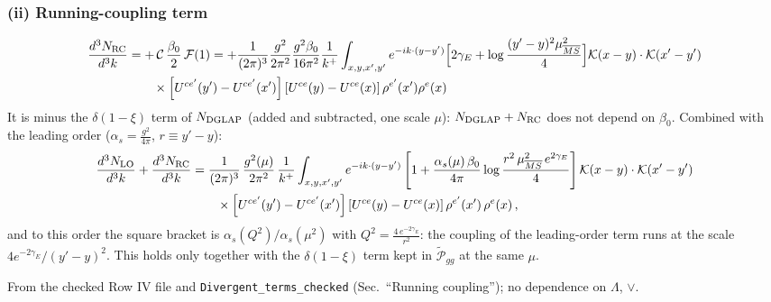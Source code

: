 \documentclass[9pt]{article}
\numberwithin{equation}{section}
\begin{document}
\subsubsection{(ii) Running-coupling term}
\begin{align}
\frac{d^{3}N_{\rm RC}}{d^{3}k} & = +\,\mathcal{C}\,\frac{\beta_{0}}{2}\,\mathcal{F}(1)= +\frac{1}{(2\pi)^{3}}\frac{g^{2}}{2\pi^{2}}\frac{g^{2}\beta_{0}}{16\pi^{2}}\frac{1}{k^{+}}\int_{x,y,x',y'}e^{-ik\cdot(y-y')}\Big[2\gamma_{E}+\log\frac{(y'-y)^{2}\mu^{2}_{\overline{MS}}}{4}\Big]\mathcal{K}(x-y)\cdot\mathcal{K}(x'-y')\notag \\ & \qquad\times\left[U^{ce'}(y') - U^{ce'}(x')\right]\left[U^{ce}(y) - U^{ce}(x)\right]\rho^{e'}(x')\rho^{e}(x)
\end{align}
It is minus the $\delta(1-\xi)$ term of $N_{\rm DGLAP}$ (added and subtracted, one scale $\mu$): $N_{\rm DGLAP}+N_{\rm RC}$ does not depend on $\beta_{0}$. Combined with the leading order ($\alpha_{s}=\frac{g^{2}}{4\pi}$, $r\equiv y'-y$):
\begin{align}
\frac{d^{3}N_{\rm LO}}{d^{3}k}+\frac{d^{3}N_{\rm RC}}{d^{3}k}&=\frac{1}{(2\pi)^{3}}\,\frac{g^{2}(\mu)}{2\pi^{2}}\,\frac{1}{k^{+}}\int_{x,y,x',y'}e^{-ik\cdot(y-y')}\left[1+\frac{\alpha_{s}(\mu)\,\beta_{0}}{4\pi}\log\frac{r^{2}\,\mu^{2}_{\overline{MS}}\,e^{2\gamma_{E}}}{4}\right]\mathcal{K}(x-y)\cdot\mathcal{K}(x'-y')\notag\\
&\qquad\times\left[U^{ce'}(y')-U^{ce'}(x')\right]\left[U^{ce}(y)-U^{ce}(x)\right]\rho^{e'}(x')\,\rho^{e}(x)\,,
\end{align}
and to this order the square bracket is $\alpha_{s}(Q^{2})/\alpha_{s}(\mu^{2})$ with $Q^{2}=\frac{4\,e^{-2\gamma_{E}}}{r^{2}}$: the coupling of the leading-order term runs at the scale $4e^{-2\gamma_{E}}/(y'-y)^{2}$. This holds only together with the $\delta(1-\xi)$ term kept in $\widetilde{\mathcal P}_{gg}$ at the same $\mu$.\par
{\color{gray}\small From the checked Row IV file and \texttt{Divergent\_terms\_checked} (Sec.~``Running coupling''); no dependence on $\Lambda$, $\vee$.}
\end{document}
